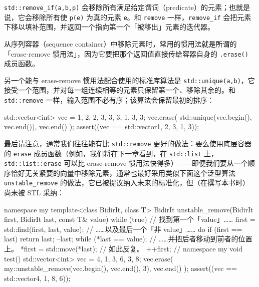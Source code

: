 \texttt{std::\allowbreak{}remove\_\allowbreak{}if(\allowbreak{}a,\allowbreak{}b,\allowbreak{}p)\allowbreak{}} 会移除所有满足给定谓词（predicate）的元素；也就是说，它会移除所有使 \texttt{p(\allowbreak{}e)\allowbreak{}} 为真的元素 \texttt{e}。和 \texttt{remove} 一样，\texttt{remove\_\allowbreak{}if} 会把元素下移以填补范围，并返回一个指向第一个「被移出」元素的迭代器。

从序列容器（sequence container）中移除元素时，常用的惯用法就是所谓的「erase-remove 惯用法」，因为它要把那个返回值直接传给容器自身的 \texttt{.erase(\allowbreak{})\allowbreak{}} 成员函数。

另一个能与 erase-remove 惯用法配合使用的标准库算法是 \texttt{std::\allowbreak{}unique(\allowbreak{}a,\allowbreak{}b)\allowbreak{}}，它接受一个范围，并对每一组连续相等的元素只保留第一个、移除其余的。和 \texttt{std::\allowbreak{}remove} 一样，输入范围不必有序；该算法会保留最初的排序：

\begin{codebox}[cpp]
    std::vector<int> vec = {1, 2, 2, 3, 3, 3, 1, 3, 3};
    vec.erase(
      std::unique(vec.begin(), vec.end()),
      vec.end()
    );
    assert((vec == std::vector{1, 2, 3, 1, 3}));
\end{codebox}

最后请注意，通常我们往往能有比 \texttt{std::\allowbreak{}remove} 更好的做法：要么使用底层容器的 \texttt{erase} 成员函数（例如，我们将在下一章看到，在 \texttt{std::\allowbreak{}list} 上，\texttt{std::\allowbreak{}list::\allowbreak{}erase} 可以比 erase-remove 惯用法快得多）——即便我们要从一个顺序恰好无关紧要的向量中移除元素，通常也最好采用类似下面这个泛型算法 \texttt{unstable\_\allowbreak{}remove} 的做法，它已被提议纳入未来的标准化，但（在撰写本书时）尚未被 STL 采纳：

\begin{codebox}[cpp]
    namespace my {
      template<class BidirIt, class T>
      BidirIt unstable_remove(BidirIt first, BidirIt last, const T& value)
      {
        while (true) {
          // 找到第一个「value」……
          first = std::find(first, last, value);
          // ……以及最后一个「非 value」……
          do {
            if (first == last) {
              return last;
            }
            --last;
          } while (*last == value);
          // ……并把后者移动到前者的位置上。
          *first = std::move(*last);
          // 如此反复。
          ++first;
        }
      }
    } // namespace my
    void test()
    {
      std::vector<int> vec = {4, 1, 3, 6, 3, 8};
      vec.erase(
        my::unstable_remove(vec.begin(), vec.end(), 3),
        vec.end()
      );
      assert((vec == std::vector{4, 1, 8, 6}));
    }
\end{codebox}

